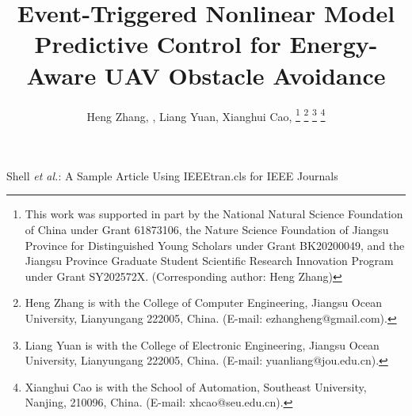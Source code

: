 \documentclass[lettersize,journal]{IEEEtran}
\begin{document}
\title{Event-Triggered Nonlinear Model Predictive Control for Energy-Aware UAV Obstacle Avoidance}

\author{
	Heng Zhang, , Liang Yuan, Xianghui Cao, 
	\thanks{
		This work was supported in part by the National Natural Science Foundation of China under Grant 61873106,
		the Nature Science Foundation of Jiangsu Province for Distinguished Young Scholars under Grant BK20200049,
		and the Jiangsu Province Graduate Student Scientific Research Innovation Program under Grant SY202572X.
		(Corresponding author: Heng Zhang)
	}
	\thanks{
		Heng Zhang is with the College of Computer Engineering,
		Jiangsu Ocean University, Lianyungang 222005, China.
		(E-mail: ezhangheng@gmail.com).
	}
	\thanks{
		Liang Yuan is with the College of Electronic Engineering, Jiangsu Ocean University, Lianyungang 222005, China.
		(E-mail: yuanliang@jou.edu.cn).
	}
	\thanks{
		Xianghui Cao is with the School of Automation,
		Southeast University, Nanjing, 210096, China.
		(E-mail: xhcao@seu.edu.cn).
	}
}

%
{Shell \MakeLowercase{\textit{et al.}}: A Sample Article Using IEEEtran.cls for IEEE Journals}


\maketitle
\end{document}
